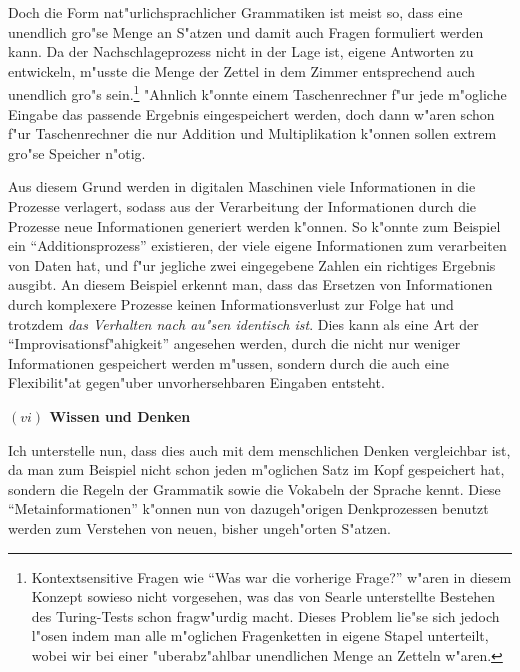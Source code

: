 \documentclass[a4paper, emulatestandardclasses, 12pt]{scrartcl}
\begin{document}
\begin{onehalfspace}
Doch die Form nat"urlichsprachlicher Grammatiken ist meist so, dass eine unendlich gro"se Menge an S"atzen und damit auch Fragen formuliert werden kann. Da der Nachschlageprozess nicht in der Lage ist, eigene Antworten zu entwickeln, m"usste die Menge der Zettel in dem Zimmer entsprechend auch unendlich gro"s sein.\footnote{Kontextsensitive Fragen wie "`Was war die vorherige Frage?"' w"aren in diesem Konzept sowieso nicht vorgesehen, was das von Searle unterstellte Bestehen des Turing-Tests schon fragw"urdig macht. Dieses Problem lie"se sich jedoch l"osen indem man alle m"oglichen Fragenketten in eigene Stapel unterteilt, wobei wir bei einer "uberabz"ahlbar unendlichen Menge an Zetteln w"aren.} "Ahnlich k"onnte einem Taschenrechner f"ur jede m"ogliche Eingabe das passende Ergebnis eingespeichert werden, doch dann w"aren schon f"ur Taschenrechner die nur Addition und Multiplikation k"onnen sollen extrem gro"se Speicher n"otig. 

Aus diesem Grund werden in digitalen Maschinen viele Informationen in die Prozesse verlagert, sodass aus der Verarbeitung der Informationen durch die Prozesse neue Informationen generiert werden k"onnen. So k"onnte zum Beispiel ein "`Additionsprozess"' existieren, der viele eigene Informationen zum verarbeiten von Daten hat, und f"ur jegliche zwei eingegebene Zahlen ein richtiges Ergebnis ausgibt. An diesem Beispiel erkennt man, dass das Ersetzen von Informationen durch komplexere Prozesse keinen Informationsverlust zur Folge hat und trotzdem \emph{das Verhalten nach au"sen identisch ist}. Dies kann als eine Art der "`Improvisationsf"ahigkeit"' angesehen werden, durch die nicht nur weniger Informationen gespeichert werden m"ussen, sondern durch die auch eine Flexibilit"at gegen"uber unvorhersehbaren Eingaben entsteht. 

\vspace{5mm}
\noindent\textbf{$(vi)$ Wissen und Denken}

\noindent Ich unterstelle nun, dass dies auch mit dem menschlichen Denken vergleichbar ist, da man zum Beispiel nicht schon jeden m"oglichen Satz im Kopf gespeichert hat, sondern die Regeln der Grammatik sowie die Vokabeln der Sprache kennt. Diese "`Metainformationen"' k"onnen nun von dazugeh"origen Denkprozessen benutzt werden zum Verstehen von neuen, bisher ungeh"orten S"atzen.


\end{onehalfspace}
\end{document}
